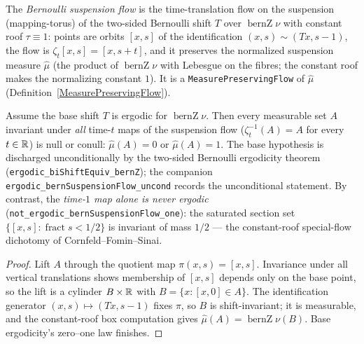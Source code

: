 \begin{definition}\label{bernSuspensionFlow}
  \leanok
  The \emph{Bernoulli suspension flow} is the time-translation flow on the suspension
  (mapping-torus) of the two-sided Bernoulli shift \(T\) over \(\operatorname{bernZ}\nu\) with
  constant roof \(\tau \equiv 1\): points are orbits \([x, s]\) of the identification
  \((x, s) \sim (Tx, s - 1)\), the flow is \(\zeta_t[x,s] = [x, s+t]\), and it preserves the
  normalized suspension measure \(\hat\mu\) (the product of \(\operatorname{bernZ}\nu\) with
  Lebesgue on the fibres; the constant roof makes the normalizing constant \(1\)). It is a
  \texttt{MeasurePreservingFlow} of \(\hat\mu\) (Definition~\ref{MeasurePreservingFlow}).
\end{definition}

\begin{theorem}\label{ergodic_bernSuspensionFlow}
  \leanok
  Assume the base shift \(T\) is ergodic for \(\operatorname{bernZ}\nu\). Then every measurable
  set \(A\) invariant under \emph{all} time-\(t\) maps of the suspension flow
  (\(\zeta_t^{-1}(A) = A\) for every \(t \in \mathbb{R}\)) is null or conull:
  \(\hat\mu(A) = 0\) or \(\hat\mu(A) = 1\). The base hypothesis is discharged unconditionally by
  the two-sided Bernoulli ergodicity theorem (\texttt{ergodic\_biShiftEquiv\_bernZ}); the
  companion \texttt{ergodic\_bernSuspensionFlow\_uncond} records the unconditional statement. By
  contrast, the \emph{time-\(1\) map alone is never ergodic}
  (\texttt{not\_ergodic\_bernSuspensionFlow\_one}): the saturated section set
  \(\{[x,s] : \operatorname{fract} s < 1/2\}\) is invariant of mass \(1/2\) --- the constant-roof
  special-flow dichotomy of Cornfeld--Fomin--Sinai.
\end{theorem}
\begin{proof}\leanok
  Lift \(A\) through the quotient map \(\pi(x,s) = [x,s]\). Invariance under all vertical
  translations shows membership of \([x,s]\) depends only on the base point, so the lift is a
  cylinder \(B \times \mathbb{R}\) with \(B = \{x : [x,0] \in A\}\). The identification generator
  \((x,s) \mapsto (Tx, s-1)\) fixes \(\pi\), so \(B\) is shift-invariant; it is measurable, and
  the constant-roof box computation gives \(\hat\mu(A) = \operatorname{bernZ}\nu(B)\). Base
  ergodicity's zero--one law finishes.
\end{proof}

